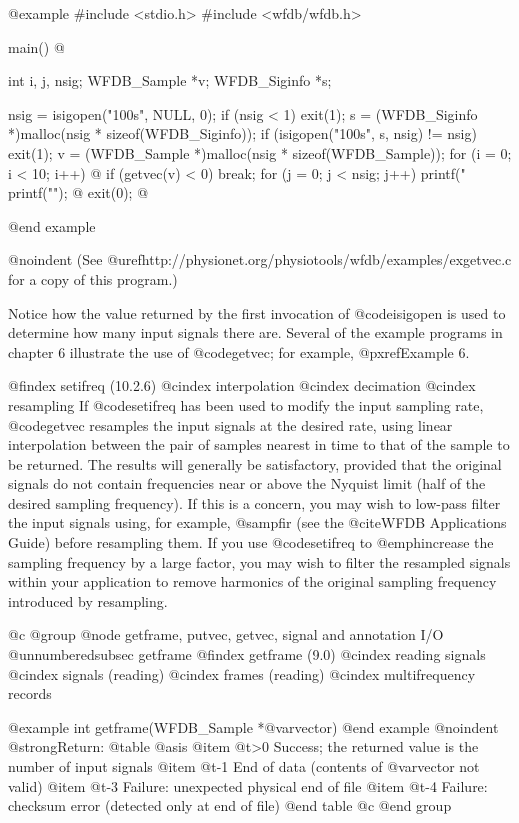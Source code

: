 {{{{{{{{@example
#include <stdio.h>
#include <wfdb/wfdb.h>

main()
@{
    int i, j, nsig;
    WFDB_Sample *v;
    WFDB_Siginfo *s;

    nsig = isigopen("100s", NULL, 0);
    if (nsig < 1)
        exit(1);
    s = (WFDB_Siginfo *)malloc(nsig * sizeof(WFDB_Siginfo));
    if (isigopen("100s", s, nsig) != nsig)
        exit(1);
    v = (WFDB_Sample *)malloc(nsig * sizeof(WFDB_Sample));
    for (i = 0; i < 10; i++) @{
        if (getvec(v) < 0)
            break;
        for (j = 0; j < nsig; j++)
            printf("%
        printf("\n");
    @}
    exit(0);
@}
@end example

@noindent
(See @uref{http://physionet.org/physiotools/wfdb/examples/exgetvec.c}
for a copy of this program.)

Notice how the value returned by the first invocation of @code{isigopen}
is used to determine how many input signals there are.  Several of the
example programs in chapter 6 illustrate the use of @code{getvec}; for
example, @pxref{Example 6}.

@findex setifreq (10.2.6)
@cindex interpolation
@cindex decimation
@cindex resampling
If @code{setifreq} has been used to modify the input sampling rate,
@code{getvec} resamples the input signals at the desired rate, using
linear interpolation between the pair of samples nearest in time to that
of the sample to be returned.  The results will generally be
satisfactory, provided that the original signals do not contain
frequencies near or above the Nyquist limit (half of the desired
sampling frequency).  If this is a concern, you may wish to low-pass
filter the input signals using, for example, @samp{fir} (see the
@cite{WFDB Applications Guide}) before resampling them.  If you use
@code{setifreq} to @emph{increase} the sampling frequency by a large
factor, you may wish to filter the resampled signals within your
application to remove harmonics of the original sampling frequency
introduced by resampling.

@c @group
@node    getframe, putvec, getvec, signal and annotation I/O
@unnumberedsubsec getframe
@findex getframe (9.0)
@cindex reading signals
@cindex signals (reading)
@cindex frames (reading)
@cindex multifrequency records

@example
int getframe(WFDB_Sample *@var{vector})
@end example
@noindent
@strong{Return:}
@table @asis
@item @t{>0}
Success;  the returned value is the number of input signals
@item @t{-1}
End of data (contents of @var{vector} not valid)
@item @t{-3}
Failure: unexpected physical end of file
@item @t{-4}
Failure: checksum error (detected only at end of file)
@end table
@c @end group

}}}}}}}}

